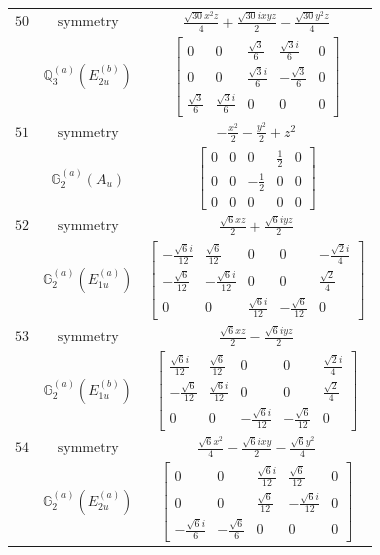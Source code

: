 \documentclass[fleqn,8pt,landscape]{jsarticle}
\begin{document}
\begin{longtable}{ccc}
$ 50 $ & $ \text{symmetry} $ & $ \frac{\sqrt{30} x^{2} z}{4} + \frac{\sqrt{30} i x y z}{2} - \frac{\sqrt{30} y^{2} z}{4} $ \\
$  $ & $ \mathbb{Q}_{3}^{(a)}(E_{2u}^{(b)}) $ & $ \begin{bmatrix} 0 & 0 & \frac{\sqrt{3}}{6} & \frac{\sqrt{3} i}{6} & 0 \\ 0 & 0 & \frac{\sqrt{3} i}{6} & - \frac{\sqrt{3}}{6} & 0 \\ \frac{\sqrt{3}}{6} & \frac{\sqrt{3} i}{6} & 0 & 0 & 0 \end{bmatrix} $ \\ \hline
$ 51 $ & $ \text{symmetry} $ & $ - \frac{x^{2}}{2} - \frac{y^{2}}{2} + z^{2} $ \\
$  $ & $ \mathbb{G}_{2}^{(a)}(A_{u}) $ & $ \begin{bmatrix} 0 & 0 & 0 & \frac{1}{2} & 0 \\ 0 & 0 & - \frac{1}{2} & 0 & 0 \\ 0 & 0 & 0 & 0 & 0 \end{bmatrix} $ \\ \hline
$ 52 $ & $ \text{symmetry} $ & $ \frac{\sqrt{6} x z}{2} + \frac{\sqrt{6} i y z}{2} $ \\
$  $ & $ \mathbb{G}_{2}^{(a)}(E_{1u}^{(a)}) $ & $ \begin{bmatrix} - \frac{\sqrt{6} i}{12} & \frac{\sqrt{6}}{12} & 0 & 0 & - \frac{\sqrt{2} i}{4} \\ - \frac{\sqrt{6}}{12} & - \frac{\sqrt{6} i}{12} & 0 & 0 & \frac{\sqrt{2}}{4} \\ 0 & 0 & \frac{\sqrt{6} i}{12} & - \frac{\sqrt{6}}{12} & 0 \end{bmatrix} $ \\ \hline
$ 53 $ & $ \text{symmetry} $ & $ \frac{\sqrt{6} x z}{2} - \frac{\sqrt{6} i y z}{2} $ \\
$  $ & $ \mathbb{G}_{2}^{(a)}(E_{1u}^{(b)}) $ & $ \begin{bmatrix} \frac{\sqrt{6} i}{12} & \frac{\sqrt{6}}{12} & 0 & 0 & \frac{\sqrt{2} i}{4} \\ - \frac{\sqrt{6}}{12} & \frac{\sqrt{6} i}{12} & 0 & 0 & \frac{\sqrt{2}}{4} \\ 0 & 0 & - \frac{\sqrt{6} i}{12} & - \frac{\sqrt{6}}{12} & 0 \end{bmatrix} $ \\ \hline
$ 54 $ & $ \text{symmetry} $ & $ \frac{\sqrt{6} x^{2}}{4} - \frac{\sqrt{6} i x y}{2} - \frac{\sqrt{6} y^{2}}{4} $ \\
$  $ & $ \mathbb{G}_{2}^{(a)}(E_{2u}^{(a)}) $ & $ \begin{bmatrix} 0 & 0 & \frac{\sqrt{6} i}{12} & \frac{\sqrt{6}}{12} & 0 \\ 0 & 0 & \frac{\sqrt{6}}{12} & - \frac{\sqrt{6} i}{12} & 0 \\ - \frac{\sqrt{6} i}{6} & - \frac{\sqrt{6}}{6} & 0 & 0 & 0 \end{bmatrix} $ \\ \hline

\end{longtable}
\end{document}
